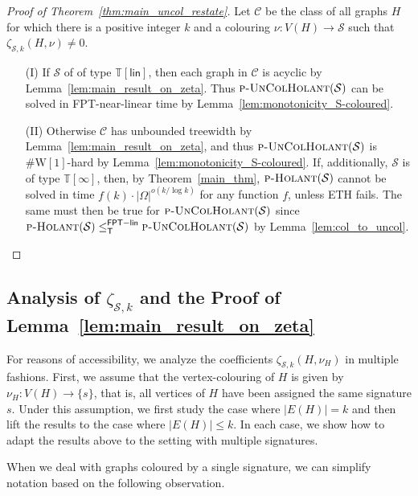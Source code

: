 \documentclass[authorcolumns,numberwithinsect]{no-lipics-v2022}
\newcommand{\W}{\mathrm{W}}
\newcommand{\fptlinred}{\leq^{\mathsf{FPT-lin}}_{\mathsf{T}}}
\newcommand{\holantprob}{\text{\sc{p-Holant}}}
\begin{document}
\begin{proof}[Proof of Theorem~\ref{thm:main_uncol_restate}]
Let $\mathcal{C}$ be the class of all graphs $H$ for which there is a positive integer $k$ and a colouring $\nu:V(H)\to \mathcal{S}$ such that $\zeta_{\mathcal{S},k}(H,\nu)\neq 0$. 
\begin{itemize}
    \item[(I)] If $\mathcal{S}$ of of type $\mathbb{T}[\mathsf{lin}]$, then each graph in $\mathcal{C}$ is acyclic by Lemma~\ref{lem:main_result_on_zeta}. Thus $\textsc{p-UnColHolant}(\mathcal{S})$ can be solved in FPT-near-linear time by Lemma~\ref{lem:monotonicity_S-coloured}.
    \item[(II)] Otherwise $\mathcal{C}$ has unbounded treewidth by Lemma~\ref{lem:main_result_on_zeta}, and thus $\textsc{p-UnColHolant}(\mathcal{S})$ is $\#\W[1]$-hard by Lemma~\ref{lem:monotonicity_S-coloured}. If, additionally, $\mathcal{S}$ is of type $\mathbb{T}[\infty]$, then, by Theorem~\ref{main_thm}, $\holantprob(\mathcal{S})$ cannot be solved in time $f(k)\cdot |\Omega|^{o(k/\log k)}$ for any function $f$, unless ETH fails. The same must then be true for $\textsc{p-UnColHolant}(\mathcal{S})$ since $\holantprob(\mathcal{S}) \fptlinred \text{\sc{p-UnColHolant}}(\mathcal{S})$ by Lemma~\ref{lem:col_to_uncol}.
\end{itemize}
\end{proof}

\subsection{Analysis of $\zeta_{\mathcal{S},k}$ and the Proof of Lemma~\ref{lem:main_result_on_zeta}}\label{sec:analysis_of_zeta}

For reasons of accessibility, we analyze the coefficients $\zeta_{\mathcal{S}, k}(H, \nu_H)$ in multiple fashions. First, we assume that the vertex-colouring of $H$ is given by $\nu_H : V(H) \to \{s\}$, that is, all vertices of $H$ have been assigned the same signature $s$. Under this assumption, we first study the case where $|E(H)| = k$ and then lift the results to the case where $|E(H)| \leq k$. In each case, we show how to adapt the results above to the setting with multiple signatures. 

When we deal with graphs coloured by a single signature, we can simplify notation based on the following observation. 
\end{document}
